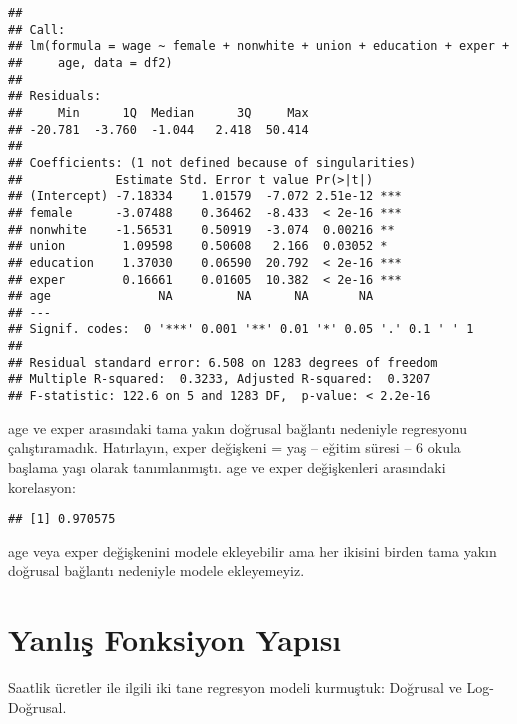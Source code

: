 \documentclass[
]{book}
\newenvironment{Shaded}{\begin{snugshade}}{\end{snugshade}}
\newcommand{\KeywordTok}[1]{\textcolor[rgb]{0.13,0.29,0.53}{\textbf{#1}}}
\newcommand{\NormalTok}[1]{#1}
\newcommand{\OperatorTok}[1]{\textcolor[rgb]{0.81,0.36,0.00}{\textbf{#1}}}
\begin{document}
\begin{verbatim}
## 
## Call:
## lm(formula = wage ~ female + nonwhite + union + education + exper + 
##     age, data = df2)
## 
## Residuals:
##     Min      1Q  Median      3Q     Max 
## -20.781  -3.760  -1.044   2.418  50.414 
## 
## Coefficients: (1 not defined because of singularities)
##             Estimate Std. Error t value Pr(>|t|)    
## (Intercept) -7.18334    1.01579  -7.072 2.51e-12 ***
## female      -3.07488    0.36462  -8.433  < 2e-16 ***
## nonwhite    -1.56531    0.50919  -3.074  0.00216 ** 
## union        1.09598    0.50608   2.166  0.03052 *  
## education    1.37030    0.06590  20.792  < 2e-16 ***
## exper        0.16661    0.01605  10.382  < 2e-16 ***
## age               NA         NA      NA       NA    
## ---
## Signif. codes:  0 '***' 0.001 '**' 0.01 '*' 0.05 '.' 0.1 ' ' 1
## 
## Residual standard error: 6.508 on 1283 degrees of freedom
## Multiple R-squared:  0.3233, Adjusted R-squared:  0.3207 
## F-statistic: 122.6 on 5 and 1283 DF,  p-value: < 2.2e-16
\end{verbatim}

age ve exper arasındaki tama yakın doğrusal bağlantı nedeniyle regresyonu çalıştıramadık. Hatırlayın, exper değişkeni = yaş -- eğitim süresi -- 6 okula başlama yaşı olarak tanımlanmıştı. age ve exper değişkenleri arasındaki korelasyon:

\begin{Shaded}
\end{Shaded}

\begin{verbatim}
## [1] 0.970575
\end{verbatim}

age veya exper değişkenini modele ekleyebilir ama her ikisini birden tama yakın doğrusal bağlantı nedeniyle modele ekleyemeyiz.

\hypertarget{yanlux131ux15f-fonksiyon-yapux131sux131}{%
\section{Yanlış Fonksiyon Yapısı}\label{yanlux131ux15f-fonksiyon-yapux131sux131}}

Saatlik ücretler ile ilgili iki tane regresyon modeli kurmuştuk: Doğrusal ve Log-Doğrusal.
\end{document}
